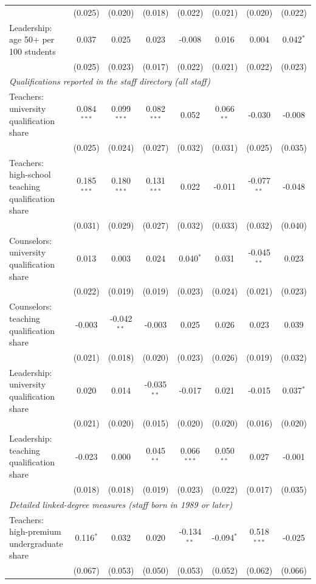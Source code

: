 \begin{table}[!htbp]
{\begin{tabular}{lccccccc}
 & (0.025) & (0.020) & (0.018) & (0.022) & (0.021) & (0.020) & (0.022) \\
\quad Leadership: age 50+ per 100 students & 0.037 & 0.025 & 0.023 & -0.008 & 0.016 & 0.004 & 0.042$^{*}$ \\
 & (0.025) & (0.023) & (0.017) & (0.022) & (0.021) & (0.022) & (0.023) \\
\multicolumn{8}{l}{\textit{Qualifications reported in the staff directory (all staff)}} \\
\quad Teachers: university qualification share & 0.084$^{***}$ & 0.099$^{***}$ & 0.082$^{***}$ & 0.052 & 0.066$^{**}$ & -0.030 & -0.008 \\
 & (0.025) & (0.024) & (0.027) & (0.032) & (0.031) & (0.025) & (0.035) \\
\quad Teachers: high-school teaching qualification share & 0.185$^{***}$ & 0.180$^{***}$ & 0.131$^{***}$ & 0.022 & -0.011 & -0.077$^{**}$ & -0.048 \\
 & (0.031) & (0.029) & (0.027) & (0.032) & (0.033) & (0.032) & (0.040) \\
\quad Counselors: university qualification share & 0.013 & 0.003 & 0.024 & 0.040$^{*}$ & 0.031 & -0.045$^{**}$ & 0.023 \\
 & (0.022) & (0.019) & (0.019) & (0.023) & (0.024) & (0.021) & (0.023) \\
\quad Counselors: teaching qualification share & -0.003 & -0.042$^{**}$ & -0.003 & 0.025 & 0.026 & 0.023 & 0.039 \\
 & (0.021) & (0.018) & (0.020) & (0.023) & (0.026) & (0.019) & (0.032) \\
\quad Leadership: university qualification share & 0.020 & 0.014 & -0.035$^{**}$ & -0.017 & 0.021 & -0.015 & 0.037$^{*}$ \\
 & (0.021) & (0.020) & (0.015) & (0.020) & (0.020) & (0.016) & (0.020) \\
\quad Leadership: teaching qualification share & -0.023 & 0.000 & 0.045$^{**}$ & 0.066$^{***}$ & 0.050$^{**}$ & 0.027 & -0.001 \\
 & (0.018) & (0.018) & (0.019) & (0.023) & (0.022) & (0.017) & (0.035) \\
\multicolumn{8}{l}{\textit{Detailed linked-degree measures (staff born in 1989 or later)}} \\
\quad Teachers: high-premium undergraduate share & 0.116$^{*}$ & 0.032 & 0.020 & -0.134$^{**}$ & -0.094$^{*}$ & 0.518$^{***}$ & -0.025 \\
 & (0.067) & (0.053) & (0.050) & (0.053) & (0.052) & (0.062) & (0.066) \\

\end{tabular}}
\end{table}
